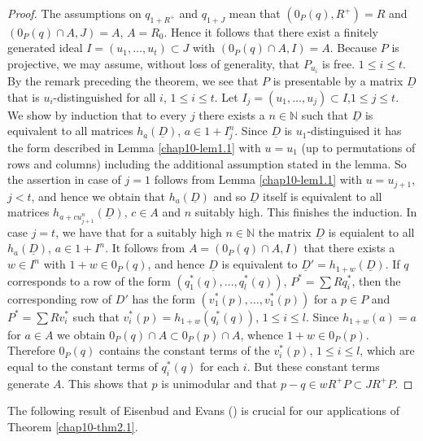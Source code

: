 \begin{proof}
The assumptions on $q_{1+R^{+}}$ and $q_{1+J}$ mean that
$(0_{P}(q),R^{+})=R$ and $(0_{P}(q)\cap A,J)=A$, $A=R_{0}$. Hence it
follows that there exist a finitely generated ideal
$I=(u_{1},\ldots,u_{t})\subset J$ with $(0_{P}(q)\cap A,I)=A$. Because
$P$ is projective, we may assume, without loss of generality, that
$P_{u_{i}}$ is free. $1\leq i\leq t$. By the remark preceding the
theorem, we see that $P$ is presentable by a matrix $\underline{D}$
that is $u_{i}$-distinguished for all $i$, $1\leq i\leq t$. Let
$I_{j}=(u_{1},\ldots,u_{j})\subset I$,\pageoriginale $1\leq j\leq
t$. We show by induction that to every $j$ there exists a
$n\in \mathbb{N}$ such that $\underline{D}$ is equivalent to all
matrices $h_{a}(\underline{D})$, $a\in 1+I^{n}_{j}$. Since
$\underline{D}$ is $u_{1}$-distinguised it has the form described in
Lemma \ref{chap10-lem1.1} with $u=u_{1}$ (up to permutations of rows
and columns) including the additional assumption stated in the
lemma. So the assertion in case of $j=1$ follows from Lemma 
\ref{chap10-lem1.1} with $u=u_{j+1}$, $j<t$, and hence we obtain that
$h_{a}(\underline{D})$ and so $\underline{D}$ itself is equivalent to
all matrices $h_{a+cu^{n}_{j+1}}(\underline{D})$, $c\in A$ and $n$
suitably high. This finishes the induction. In case $j=t$, we have
that for a suitably high $n\in \mathbb{N}$ the matrix $\underline{D}$
is equialent to all $h_{a}(\underline{D})$, $a\in 1+I^{n}$. It follows
from $A=(0_{P}(q)\cap A,I)$ that there exists a $w\in I^{n}$ with
$1+w\in 0_{P}(q)$, and hence $\underline{D}$ is equivalent to
$\underline{D}'=h_{1+w}(\underline{D})$. If $q$ corresponds to a row
of the form $(q^{*}_{1}(q),\ldots,q^{*}_{l}(q))$, $P^{*}=\sum
Rq^{*}_{i}$, then the corresponding row of $D'$ has the form
$(v^{*}_{1}(p),\ldots,v^{*}_{1}(p))$ for a $p\in P$ and $P^{*}=\sum
Rv^{*}_{i}$ such that $v^{*}_{i}(p)=h_{1+w}(q^{*}_{i}(q))$, $1\leq
i\leq l$. Since $h_{1+w}(a)=a$ for $a\in A$ we obtain $0_{P}(q)\cap
A\subset 0_{P}(p)\cap A$, whence $1+w\in 0_{P}(p)$. Therefore
$0_{P}(q)$ contains the constant terms of the $v^{*}_{i}(p)$, $1\leq
i\leq l$, which are equal to the constant terms of $q^{*}_{i}(q)$ for
each $i$. But these constant terms generate $A$. This shows that $p$
is unimodular and that $p-q\in wR^{+}P\subset JR^{+}P$. 
\end{proof}

The following result of Eisenbud and Evans (\cite{chap10-E/E}) is
crucial for our applications of Theorem \ref{chap10-thm2.1}.

